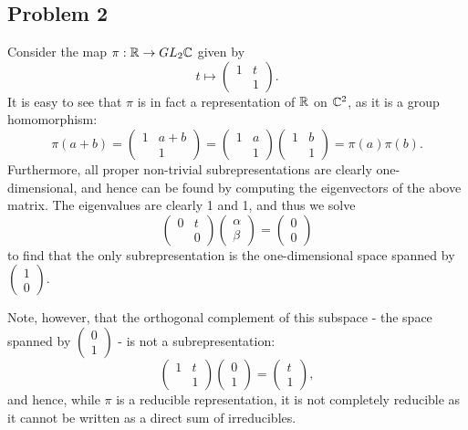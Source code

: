 \documentclass{../../mathnotes}
\begin{document}
\subsection*{Problem 2}
Consider the map $\pi:\mathbb{R}\to GL_2\mathbb{C}$ given by
\[t\mapsto \begin{pmatrix}1&t\\&1\end{pmatrix}.\]
It is easy to see that $\pi$ is in fact a representation of $\mathbb{R}$ on $\mathbb{C}^2$, as it is a group homomorphism:
\[\pi(a+b)=\begin{pmatrix}1&a+b\\&1\end{pmatrix}=\begin{pmatrix}1&a\\&1\end{pmatrix}\begin{pmatrix}1&b\\&1\end{pmatrix}=\pi(a)\pi(b).\]
Furthermore, all proper non-trivial subrepresentations are clearly one-dimensional, and hence can be found by computing the eigenvectors
of the above matrix. The eigenvalues are clearly 1 and 1, and thus we solve
\[\begin{pmatrix}0&t\\&0\end{pmatrix}\begin{pmatrix}\alpha\\\beta\end{pmatrix}=\begin{pmatrix}0\\0\end{pmatrix}\]
to find that the only subrepresentation is the one-dimensional space spanned by $\begin{pmatrix}1\\0\end{pmatrix}$.

Note, however, that the orthogonal complement of this subspace - the space spanned by $\begin{pmatrix}0\\1\end{pmatrix}$ - is not a subrepresentation:
\[\begin{pmatrix}1&t\\&1\end{pmatrix}\begin{pmatrix}0\\1\end{pmatrix}=\begin{pmatrix}t\\1\end{pmatrix},\]
and hence, while $\pi$ is a reducible representation, it is not completely reducible as it cannot be written as a direct sum of irreducibles.
\end{document}

